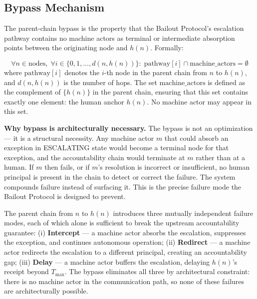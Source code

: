\subsection{Bypass Mechanism}\label{sec:bypass-mechanism}

The parent-chain bypass is the property that the Bailout Protocol's escalation pathway contains no machine actors as terminal or intermediate absorption points between the originating node and $h(n)$. Formally:

\begin{equation}
\forall n \in \text{nodes},\; \forall i \in \{0, 1, \dots, d(n, h(n))\}:\; \text{pathway}[i] \cap \text{machine\_actors} = \emptyset \tag{BP}
\end{equation}
where $\text{pathway}[i]$ denotes the $i$-th node in the parent chain from $n$ to $h(n)$, and $d(n, h(n))$ is the number of hops. The set $\text{machine\_actors}$ is defined as the complement of $\{h(n)\}$ in the parent chain, ensuring that this set contains exactly one element: the human anchor $h(n)$. No machine actor may appear in this set.

\medskip\noindent\textbf{Why bypass is architecturally necessary.} The bypass is not an optimization — it is a structural necessity. Any machine actor $m$ that could absorb an exception in ESCALATING state would become a terminal node for that exception, and the accountability chain would terminate at $m$ rather than at a human. If $m$ then fails, or if $m$'s resolution is incorrect or insufficient, no human principal is present in the chain to detect or correct the failure. The system compounds failure instead of surfacing it. This is the precise failure mode the Bailout Protocol is designed to prevent.

The parent chain from $n$ to $h(n)$ introduces three mutually independent failure modes, each of which alone is sufficient to break the upstream accountability guarantee: (i) \textbf{Intercept} — a machine actor absorbs the escalation, suppresses the exception, and continues autonomous operation; (ii) \textbf{Redirect} — a machine actor redirects the escalation to a different principal, creating an accountability gap; (iii) \textbf{Delay} — a machine actor buffers the escalation, delaying $h(n)$'s receipt beyond $T_{\max}$. The bypass eliminates all three by architectural constraint: there is no machine actor in the communication path, so none of these failures are architecturally possible.

